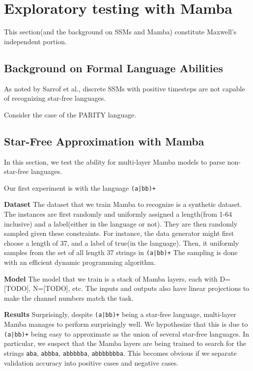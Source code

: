 \section{Exploratory testing with Mamba}
This section(and the background on SSMs and Mamba) constitute Maxwell's
independent portion.

\subsection{Background on Formal Language Abilities}
As noted by Sarrof et al.\cite{ssmformal}, discrete SSMs with positive timesteps
are not capable of recognizing star-free languages.

Consider the case of the PARITY language.




\subsection{Star-Free Approximation with Mamba}
In this section, we test the ability for multi-layer Mamba models to parse
non-star-free languages.

Our first experiment is with the language \texttt{(a|bb)+}

\textbf{Dataset} The dataset that we train Mamba to recognize is a synthetic
dataset.
The instances are first randomly and uniformly assigned a length(from 1-64
inclusive) and a label(either in the language or not).
They are then randomly sampled given these constraints.
For instance, the data generator might first choose a length of 37, and a label
of true(in the language).
Then, it uniformly samples from the set of all length 37 strings in
\texttt{(a|bb)+}
The sampling is done with an efficient dynamic programming algorithm.

\textbf{Model} The model that we train is a stack of Mamba layers, each with 
D=[TODO], N=[TODO], etc.
The inputs and outputs also have linear projections to make the channel numbers
match the task.

\textbf{Results} Surprisingly, despite \texttt{(a|bb)+} being a star-free
language, multi-layer Mamba manages to perform surprisingly well.
We hypothesize that this is due to \texttt{(a|bb)+} being easy to approximate
as the union of several star-free languages.
% 
In particular, we suspect that the Mamba layers are being trained to search for
the strings \texttt{aba}, \texttt{abbba}, \texttt{abbbbba}, \texttt{abbbbbbba}.
This becomes obvious if we separate validation accuracy into positive cases and
negative cases.

